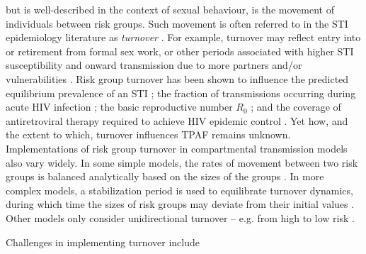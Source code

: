 but is well-described in the context of sexual behaviour,
is the movement of individuals between risk groups.
Such movement is often referred to in the STI epidemiology literature as
\textit{turnover} \citep{Watts2010}.
For example, turnover may reflect entry into or retirement from formal sex work,
or other periods associated with higher STI susceptibility and onward transmission
due to more partners and/or vulnerabilities
\citep{Marston2006,Watts2010}.
Risk group turnover has been shown to
influence the predicted equilibrium prevalence of an STI \citep{Stigum1994,Zhang2012};
the fraction of transmissions occurring during acute HIV infection \citep{Zhang2012};
the basic reproductive number $R_0$ \citep{Henry2015}; and
the coverage of antiretroviral therapy required to achieve HIV epidemic control \citep{Henry2015}.
Yet how, and the extent to which, turnover influences TPAF remains unknown.
Implementations of risk group turnover in compartmental transmission models also vary widely.
In some simple models, the rates of movement between two risk groups
is balanced analytically based on the sizes of the groups
\citep{Koopman1997,Stigum1994}.
In more complex models, a stabilization period is used
to equilibrate turnover dynamics,
during which time the sizes of risk groups may deviate
from their initial values \citep{Boily2015}.
Other models only consider unidirectional turnover
-- e.g. from high to low risk \citep{Eaton2014}.
\par
Challenges in implementing turnover include
